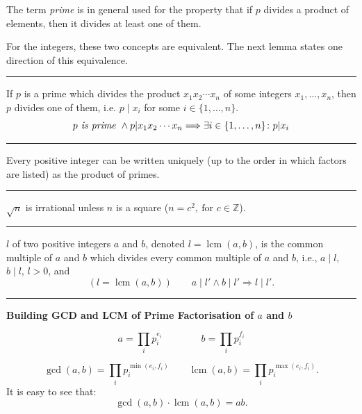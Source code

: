 \documentclass[a4paper]{extarticle}
\newcommand{\Z}{\mathbb{Z}}
\DeclareMathOperator{\lcm}{lcm}
\newcommand{\sep}{\vspace{5pt}\noindent\hrule\vspace{5pt}}
\begin{document}
\begin{multicols*}{2}
The term \emph{prime} is in general used for the
property that if $p$ divides a product of elements, then it divides at least one
of them. 

For the integers, these two concepts are equivalent. The next lemma
states one direction of this equivalence.

\sep

\Lem If $p$ is a prime which divides the product $x_1x_2\cdots x_n$ of some
integers $x_1,\ldots,x_n$, then $p$ divides one of them, i.e. $p\mid x_i$ for
some $i\in\{1,\ldots,n\}$.
\[
p \emph{ is prime } \land p|x_1x_2\cdots x_n \Longrightarrow
\exists i\in\{1,\ldots,n\} \colon p|x_i
\] 

\sep

 Every positive integer can be written
uniquely (up to the order in which factors are listed) as the product of primes. 

\sep

\Thm $\sqrt{n}$ is irrational unless $n$ is a square ($n=c^2,\
\text{for }c\in\Z$).

\sep

 $l$ of two positive integers $a$ and
$b$, denoted $l=\lcm(a,b)$, is the common multiple of $a$ and $b$ which divides
every common multiple of $a$ and $b$, i.e., $a\mid l$, $b\mid l$, $l>0$, and
\[
(l=\lcm(a,b))\qquad 
a\mid l' \land b\mid l' \Longrightarrow l\mid l'.
\] 

\sep

\textbf{Building GCD and LCM of Prime Factorisation of $a$ and $b$}

\[
a = \prod_{i} p_i^{e_i} \qquad  \qquad b = \prod_{i} p_i^{f_i}
\]

\[
\gcd (a,b) = \prod_{i} p_i^{\min(e_i,f_i)}
\qquad 
\lcm (a,b) = \prod_{i} p_i^{\max(e_i,f_i)}.
\]
It is easy to see that:
\[
\gcd(a,b) \cdot \lcm(a,b) = ab.
\]


\end{multicols*}
\end{document}
